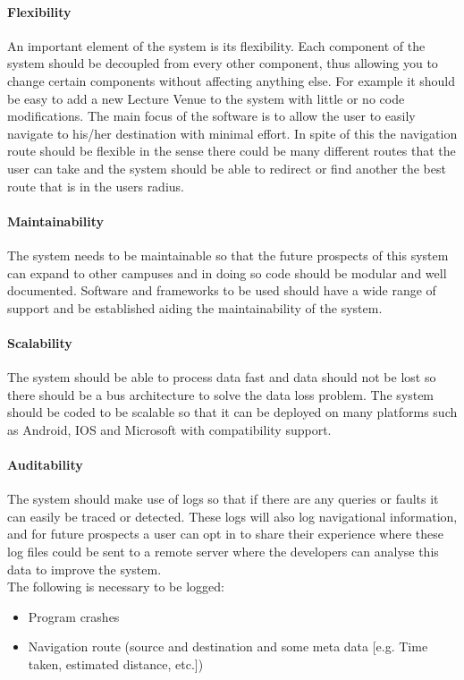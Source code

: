 \documentclass[runningheads,a4paper]{llncs}
\begin{document}
\paragraph{Flexibility \\}
 An important element of the system is its flexibility. 
 Each component of the system should be decoupled from every other component, thus allowing you to change certain components without affecting anything else. 
 For example it should be easy to add a new Lecture Venue to the system with little or no code modifications. 
 The main focus of the software is to allow the user to easily navigate to his/her destination with minimal effort.
 In spite of this the navigation route should be flexible in the sense there could be many different routes that the user can take and the system should be able to redirect or find another the best route that is in the users radius.

\paragraph{Maintainability \\}
 The system needs to be maintainable so that the future prospects of this system can expand to other campuses and in doing so code should be modular and well documented. Software and frameworks to be used should have a wide range of support and be established aiding the maintainability of the system.

\paragraph{Scalability \\}
 The system should be able to process data fast and data should not be lost so there should be a bus architecture to solve the data loss problem. The system should be coded to be scalable so that it can be deployed on many platforms such as Android, IOS and Microsoft with compatibility support.

\paragraph{Auditability \\}
 The system should make use of logs so that if there are any  queries or faults it can easily be traced or detected. These logs will also log navigational information, and for future prospects a user can opt in to share their experience where these log files could be sent to a remote server where the developers can analyse this data to improve the system. \\The following is necessary to be logged:
 \begin{itemize}
 	\item Program crashes
 	\item Navigation route (source and destination and some meta data [e.g. Time taken, estimated distance, etc.])
 \end{itemize}
 
\end{document}
